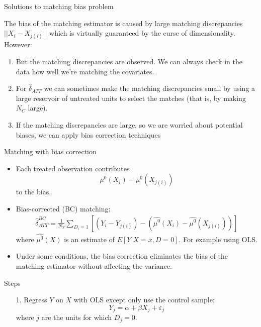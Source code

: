 \documentclass{beamer}
\begin{document}
\begin{frame}{Solutions to matching bias problem}
	
The bias of the matching estimator is caused by large matching discrepancies $||X_i - X_{j(i)}||$ which is virtually guaranteed by the curse of dimensionality.  However:
	\begin{enumerate}
	\item But the matching discrepancies are observed. We can always check in the data how well we're matching the covariates.

	\item For $\widehat{\delta}_{ATT}$ we can sometimes make the matching discrepancies small by using a large reservoir of untreated units to select the matches (that is, by making $N_C$ large).

  \item If the matching discrepancies are large, so we are worried about potential biases, we can apply bias correction techniques

	\end{enumerate}
\end{frame}


\begin{frame}{Matching with bias correction}
	
	\begin{itemize}
	\item Each treated observation contributes$$\mu^0(X_i) - \mu^0(X_{j(i)})$$to the bias.
	\item Bias-corrected (BC) matching:
		\begin{eqnarray*}
		\widehat{\delta}_{ATT}^{BC} = \frac{1}{N_T} \sum_{D_i=1} \left[ (Y_i - Y_{j(i)}) - ( \widehat{\mu^0}(X_i) - \widehat{\mu^0}(X_{j(i)}) ) \right]
		\end{eqnarray*}where $\widehat{\mu^0}(X)$ is an estimate of $E[Y|X=x,D=0]$.  For example using OLS.  
	\item Under some conditions, the bias correction eliminates the bias of the matching estimator without affecting the variance.
	\end{itemize}
\end{frame}


\begin{frame}{Steps}

\begin{enumerate}
\item[1.  ]Regress $Y$ on $X$ with OLS except only use the control sample:
\begin{equation}
Y_j = \alpha + \beta X_j + \varepsilon_j \nonumber
\end{equation}where $j$ are the units for which $D_j=0$.  
\end{enumerate}

\end{frame}
\end{document}
